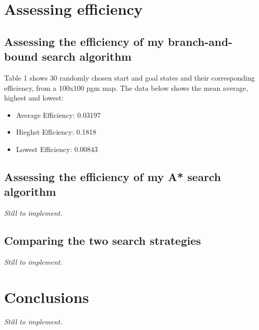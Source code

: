 \documentclass[11pt,oneside]{article}
\begin{document}
\section{Assessing efficiency}
 
\subsection{Assessing the efficiency of my branch-and-bound search algorithm}
Table 1 shows 30 randomly chosen start and goal states and their corresponding efficiency, from a 100x100 pgm map. The data below shows the mean average, highest and lowest:
\begin{itemize}
	\item Average Efficiency: 0.03197
	\item Hieghst Efficiency: 0.1818
	\item Lowest Efficiency: 0.00843
\end{itemize}




\subsection{Assessing the efficiency of my A* search algorithm}
\textit{Still to implement.}

\subsection{Comparing the two search strategies}
\textit{Still to implement.}

\section{Conclusions}
\textit{Still to implement.}
\end{document}
